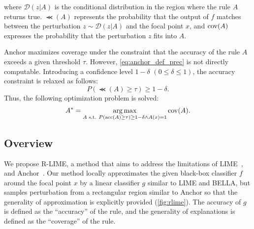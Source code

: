\documentclass[11pt]{article}
\begin{document}
where $\mathcal{D}(z|A)$ is the conditional distribution in the region
where the rule $A$ returns true.
$\Prec(A)$ represents the probability that the output of $f$ matches
between the perturbation $z\sim\mathcal{D}(z|A)$ and the focal point $x$,
and $\operatorname{cov}(A)$ expresses the probability that the perturbation $z$ fits into $A$.

Anchor maximizes coverage under the constraint that
the accuracy of the rule $A$ exceeds a given threshold $\tau$.
However, \cref{eq:anchor_def_prec} is not directly computable.
Introducing a confidence level $1-\delta$ $(0\le\delta\le1)$,
the accuracy constraint is relaxed as follows:
\begin{equation}
	\label{eq:const_prec}
	P(\Prec(A)\ge\tau)\ge1-\delta.
\end{equation}
Thus, the following optimization problem is solved:
\begin{equation}
	\label{eq:main_problem}
	A^*=\underset{A \text{~s.t. } P(\operatorname{acc}(A)\ge\tau)\ge1-\delta\wedge A(x)=1}
	{\arg\max}\operatorname{cov}(A).
\end{equation}

\subsection{Overview}
We propose R-LIME,
a method that aims to address the limitations of LIME~\cite{ribeiro2016why},
and Anchor~\cite{ribeiro2018anchors}.
Our method locally approximates the given black-box classifier $f$
around the focal point $x$ by a linear classifier $g$ similar to LIME and BELLA,
but samples perturbation from a rectangular region similar to Anchor
so that the generality of approximation is explicitly provided
(\cref{fig:rlime}).
The accuracy of $g$ is defined as the ``accuracy'' of the rule,
and the generality of explanations is defined as the ``coverage'' of the rule.
\end{document}
